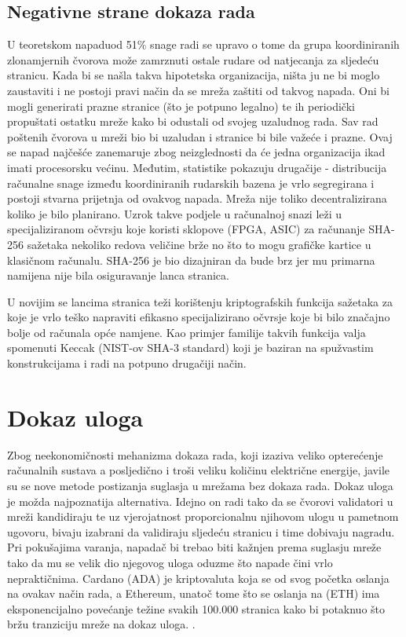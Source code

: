\documentclass[utf8, zavrsni]{fer}
\begin{document}
\subsection{Negativne strane dokaza rada}
U teoretskom napadu\footnotemark od 51\% snage radi se upravo o tome da grupa koordiniranih zlonamjernih čvorova može zamrznuti ostale rudare od natjecanja za sljedeću stranicu. Kada bi se našla takva hipotetska organizacija, ništa ju ne bi moglo zaustaviti i ne postoji pravi način da se mreža zaštiti od takvog napada. Oni bi mogli generirati prazne stranice (što je potpuno legalno) te ih periodički propuštati ostatku mreže kako bi odustali od svojeg uzaludnog rada. Sav rad poštenih čvorova u mreži bio bi uzaludan i stranice bi bile važeće i prazne. Ovaj se napad najčešće zanemaruje zbog neizglednosti da će jedna organizacija ikad imati procesorsku većinu. Međutim, statistike pokazuju drugačije - distribucija računalne snage između koordiniranih rudarskih bazena je vrlo segregirana i postoji stvarna prijetnja od ovakvog napada. Mreža nije toliko decentralizirana koliko je bilo planirano. Uzrok takve podjele u računalnoj snazi leži u specijaliziranom očvrsju koje koristi sklopove (FPGA, ASIC) za računanje SHA-256 sažetaka nekoliko redova veličine brže no što to mogu grafičke kartice u klasičnom računalu. SHA-256 je bio dizajniran da bude brz jer mu primarna namijena nije bila osiguravanje lanca stranica.

U novijim se lancima stranica teži korištenju kriptografskih funkcija sažetaka za koje je vrlo teško napraviti efikasno specijalizirano očvrsje koje bi bilo značajno bolje od računala opće namjene. Kao primjer familije takvih funkcija valja spomenuti Keccak (NIST-ov SHA-3 standard) koji je baziran na spužvastim konstrukcijama i radi na potpuno drugačiji način.

\section{Dokaz uloga}
Zbog neekonomičnosti mehanizma dokaza rada, koji izaziva veliko opterećenje računalnih sustava a posljedično i troši veliku količinu električne energije, javile su se nove metode postizanja suglasja u mrežama bez dokaza rada. Dokaz uloga\footnotemark {}
je možda najpoznatija alternativa. Idejno on radi tako da se čvorovi validatori u mreži kandidiraju te uz vjerojatnost proporcionalnu njihovom ulogu u pametnom ugovoru, bivaju izabrani da validiraju sljedeću stranicu i time dobivaju nagradu. Pri pokušajima varanja, napadač bi trebao biti kažnjen prema suglasju mreže tako da mu se velik dio njegovog uloga oduzme što napade čini vrlo nepraktičnima. Cardano (ADA)\cite{ouroboros} \footnotemark
{} je kriptovaluta koja se od svog početka oslanja na ovakav način rada, a Ethereum, unatoč tome što se oslanja na  (ETH) ima eksponencijalno povećanje težine svakih 100.000 stranica kako bi potaknuo što bržu tranziciju mreže na dokaz uloga. \cite{wood2014ethereum}.
\end{document}
